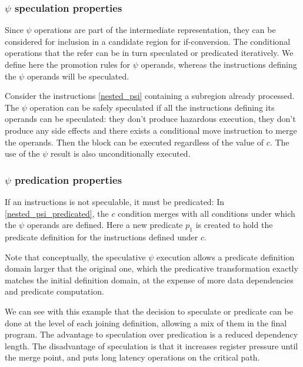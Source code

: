 \subsubsection{$\psi$ speculation properties}

Since $\psi$ operations are part of the intermediate representation, they can be considered for inclusion in a candidate region for if-conversion. The conditional operations that the refer can be in turn speculated or predicated iteratively. We define here the promotion rules for $\psi$ operands, whereas the instructions defining the $\psi$ operands will be speculated.

Consider the instructions \ref{nested_psi} containing a subregion already processed. The $\psi$ operation can be safely speculated if all the instructions defining its operands can be speculated: they don't produce hazardous execution, they don't produce any side effects and there exists a conditional move instruction to merge the operands. Then the block can be executed regardless of the value of $c$. The use of the $\psi$ result is also unconditionally executed.

\subsubsection{$\psi$ predication properties}

If an instructions is not speculable, it must be predicated:
In \ref{nested_psi_predicated}, the $c$ condition merges with all conditions under which the $\psi$ operands are defined. Here a new predicate $p_1$ is created to hold the predicate definition for the instructions defined under $c$. 

Note that conceptually, the speculative $\psi$ execution allows a predicate definition domain larger that the original one, which the predicative transformation exactly matches the initial definition domain, at the expense of more data dependencies and predicate computation.

We can see with this example that the decision to speculate or predicate can be done at the level of each joining definition, allowing a mix of them in the final program. The advantage to speculation over predication is a reduced dependency length. The disadvantage of speculation is that it increases register pressure until the merge point, and puts long latency operations on the critical path.
 

